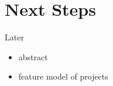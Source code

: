 \documentclass[11pt,aspectratio=169]{beamer}
\begin{document}
\section{Next Steps}

\begin{frame}{Later}
  \begin{itemize}
    \item abstract
    \item feature model of projects
  \end{itemize}
\end{frame}


\appendix
\end{document}
